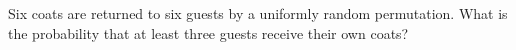 Six coats are returned to six guests by a uniformly random permutation. What is the probability that at least three guests receive their own coats?
